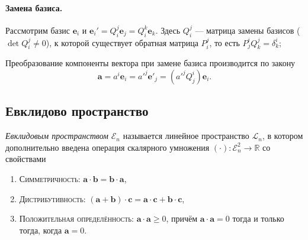 \begin{enumerate}
\paragraph{Замена базиса.} Рассмотрим базис $\mathbf{e}_i$ и $\mathbf{e}_i' =
Q_i^j \mathbf{e}_j = Q^k_i \mathbf{e}_k$. Здесь $Q^j_i$ --- матрица 
замены базисов ($\det Q^j_i \neq 0$), к которой существует обратная матрица
$P^j_i$, то есть $P^i_j Q^j_k = \delta^i_k$; 

Преобразование компоненты вектора при замене базиса производится по закону
\[
  \mathbf{a} = a^i \mathbf{e}_i = {a'}^j \mathbf{e'}_j = ({a'}^j Q^i_j)
  \mathbf{e}_i.
\]

\subsection{Евклидово пространство}

\begin{definition}
  \emph{Евклидовым пространством} $ \mathcal E_n $ называется линейное
  пространство $\mathcal{L}_n$, в котором дополнительно введена операция
  скалярного умножения $(\cdot)\colon \mathcal{E}_n^2 \to \mathbb{R}$ со
  свойствами
  \begin{enumerate}
    \item \textsc{Симметричность:} $\mathbf{a} \cdot \mathbf{b} = \mathbf{b} \cdot \mathbf{a}$,
    \item \textsc{Дистрибутивность:} $(\mathbf{a}+\mathbf{b}) \cdot \mathbf{c} = \mathbf{a} \cdot
      \mathbf{c} + \mathbf{b} \cdot \mathbf{c}$,
    \item \textsc{Положительная определённость:} $\mathbf{a} \cdot \mathbf{a} \geqslant 0$, причём $ \mathbf a \cdot
      \mathbf a = 0 $ тогда и только тогда, когда $ \mathbf a = 0 $.
  \end{enumerate}


\end{definition}
\end{enumerate}
